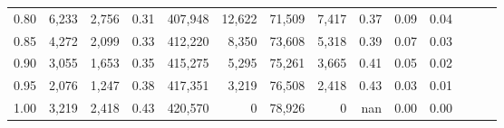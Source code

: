 \begin{tabular}{rrrrrrrrrrrrrr}
0.80 &   6,233 &  2,756 &  0.31 &  407,948 &   12,622 &  71,509 &   7,417 &  0.37 &  0.09 &      0.04 \\
0.85 &   4,272 &  2,099 &  0.33 &  412,220 &    8,350 &  73,608 &   5,318 &  0.39 &  0.07 &      0.03 \\
0.90 &   3,055 &  1,653 &  0.35 &  415,275 &    5,295 &  75,261 &   3,665 &  0.41 &  0.05 &      0.02 \\
0.95 &   2,076 &  1,247 &  0.38 &  417,351 &    3,219 &  76,508 &   2,418 &  0.43 &  0.03 &      0.01 \\
1.00 &   3,219 &  2,418 &  0.43 &  420,570 &        0 &  78,926 &       0 &   nan &  0.00 &      0.00 \\
\bottomrule
\end{tabular}
